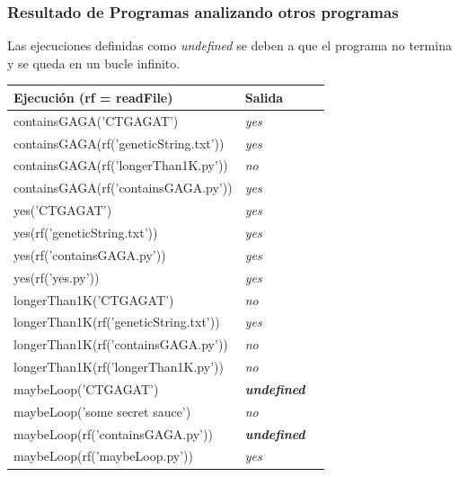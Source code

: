 \documentclass[xcolor=table]{beamer}
\begin{document}
\begin{frame}  \frametitle{Resultado de Programas analizando otros programas} \scriptsize  

Las ejecuciones definidas como \textit{undefined} se deben a que el programa no termina y se queda en un bucle infinito.

\begin{table}[]
\begin{tabular}{|l|l|l|}
\hline
\rowcolor[HTML]{EFEFEF} 
{\color[HTML]{000000} \textbf{Ejecución (rf = readFile)}}  & {\color[HTML]{000000} \textbf{Salida}}             \\ \hline\hline
containsGAGA('CTGAGAT')                                   & \textit{yes}   \\ \hline
containsGAGA(rf('geneticString.txt'))                     & \textit{yes}   \\ \hline
containsGAGA(rf('longerThan1K.py'))                       & \textit{no}  \\ \hline
containsGAGA(rf('containsGAGA.py'))                       & \textit{yes}    \\ \hline\hline
yes('CTGAGAT')                                            & \textit{yes}     \\ \hline
yes(rf('geneticString.txt'))                              & \textit{yes}    \\ \hline
yes(rf('containsGAGA.py'))                                & \textit{yes}   \\ \hline
yes(rf('yes.py'))                                         & \textit{yes}    \\ \hline\hline
longerThan1K('CTGAGAT')                                   & \textit{no}     \\ \hline
longerThan1K(rf('geneticString.txt'))                     & \textit{yes}     \\ \hline
longerThan1K(rf('containsGAGA.py'))                       & \textit{no}    \\ \hline
longerThan1K(rf('longerThan1K.py'))                       & \textit{no}    \\ \hline\hline
maybeLoop('CTGAGAT')            &{\color[HTML]{FE0000} \textit{\textbf{undefined}}} \\ \hline
maybeLoop('some secret sauce')                            & \textit{no}    \\ \hline
maybeLoop(rf('containsGAGA.py')) &{\color[HTML]{FE0000} \textit{\textbf{undefined}}} \\ \hline
maybeLoop(rf('maybeLoop.py'))              & \textit{yes}    \\ \hline
\end{tabular}
\end{table}


\end{frame} 
\end{document}
